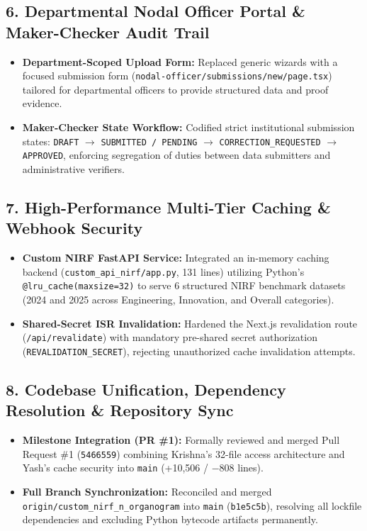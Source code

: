 \documentclass[11pt,a4paper]{article}
\begin{document}
\subsection{6. Departmental Nodal Officer Portal \& Maker-Checker Audit Trail}
\begin{itemize}[leftmargin=1.4em, itemsep=2pt]
\item \textbf{Department-Scoped Upload Form:} Replaced generic wizards with a focused submission form (\texttt{nodal-officer/submissions/new/page.tsx}) tailored for departmental officers to provide structured data and proof evidence.
\item \textbf{Maker-Checker State Workflow:} Codified strict institutional submission states: \texttt{DRAFT} $\rightarrow$ \texttt{SUBMITTED / PENDING} $\rightarrow$ \texttt{CORRECTION\_REQUESTED} $\rightarrow$ \texttt{APPROVED}, enforcing segregation of duties between data submitters and administrative verifiers.
\end{itemize}

\subsection{7. High-Performance Multi-Tier Caching \& Webhook Security}
\begin{itemize}[leftmargin=1.4em, itemsep=2pt]
\item \textbf{Custom NIRF FastAPI Service:} Integrated an in-memory caching backend (\texttt{custom\_api\_nirf/app.py}, 131 lines) utilizing Python's \texttt{@lru\_cache(maxsize=32)} to serve 6 structured NIRF benchmark datasets (2024 and 2025 across Engineering, Innovation, and Overall categories).
\item \textbf{Shared-Secret ISR Invalidation:} Hardened the Next.js revalidation route (\texttt{/api/revalidate}) with mandatory pre-shared secret authorization (\texttt{REVALIDATION\_SECRET}), rejecting unauthorized cache invalidation attempts.
\end{itemize}

\subsection{8. Codebase Unification, Dependency Resolution \& Repository Sync}
\begin{itemize}[leftmargin=1.4em, itemsep=2pt]
\item \textbf{Milestone Integration (PR \#1):} Formally reviewed and merged Pull Request \#1 (\texttt{5466559}) combining Krishna's 32-file access architecture and Yash's cache security into \texttt{main} (+10,506 / $-$808 lines).
\item \textbf{Full Branch Synchronization:} Reconciled and merged \texttt{origin/custom\_nirf\_n\_organogram} into \texttt{main} (\texttt{b1e5c5b}), resolving all lockfile dependencies and excluding Python bytecode artifacts permanently.
\end{itemize}
\end{document}
